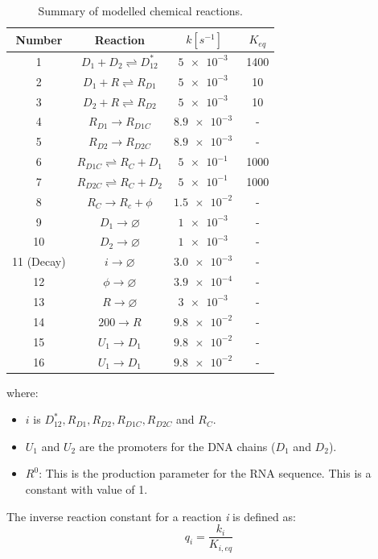 \documentclass[10pt]{article}
\begin{document}
\begin{table}[h]
	\centering
	\caption{Summary of modelled chemical reactions.} \label{tb:rxns}
	\begin{tabular}{c|c|c|c}
	Number & Reaction & $k[s^{-1}]$ & $K_{eq}$ \\ \hline 
	1 & $D_1+D_2 \rightleftharpoons D^*_{12}$ & $\num{5e-3}~$  & 1400  \\ 
	2 & $D_{1} + R \rightleftharpoons R_{D1}$ & $\num{5e-3}~$ & 10 \\ 
	3 & $D_{2} + R \rightleftharpoons R_{D2}$ & $\num{5e-3}~$ & 10 \\ 
	4 & $R_{D1} \rightarrow R_{D1C}$ & $\num{8.9e-3}~$ & - \\ 
	5 & $R_{D2} \rightarrow R_{D2C}$ & $\num{8.9e-3}~$ & - \\ 
	6 & $R_{D1C} \rightleftharpoons R_C + D_1$ & $\num{5e-1}~$ & 1000  \\ 
	7 & $R_{D2C} \rightleftharpoons R_C + D_2$ & $\num{5e-1}~$ & 1000 \\ 
	8 & $R_C \rightarrow R_c + \phi$ & $\num{1.5e-2}~$  & - \\ 
	9 & $D_1 \rightarrow \varnothing $& $\num{1e-3}~$ & - \\ 
	10 & $D_2 \rightarrow \varnothing$ & $\num{1e-3}~$ & - \\ 
	11 (Decay) & $i \rightarrow \varnothing $ & $\num{3.0e-3}~$  & - \\ 
	12 & $\phi \rightarrow \varnothing$ & $\num{3.9e-4}~$ & - \\ 
	13 & $R \rightarrow \varnothing$ & $\num{3e-3}~$ & - \\ 
	14 & $200 \rightarrow R$ & $\num{9.8e-2}~$ &-  \\ 
	15 & $U_1 \rightarrow D_1$ & $\num{9.8e-2}~$ & - \\ 
	16 & $U_1 \rightarrow D_1$ & $\num{9.8e-2}~$ & -
	\end{tabular} 
\end{table}
where: 
\begin{itemize}
 \item $i$ is $D^*_{12},R_{D1},R_{D2},R_{D1C},R_{D2C}$ and $R_{C}$.
 \item $U_1$ and $U_2$ are the promoters for the DNA chains ($D_1$ and $D_2$).
 \item $R^0$: This is the production parameter for the RNA sequence. This is a constant with value of 1.
\end{itemize}

The inverse reaction constant for a reaction \textit{i} is defined as: 
\begin{equation}
	q_i=\dfrac{k_i}{K_{i,eq}}
\end{equation}
\end{document}
